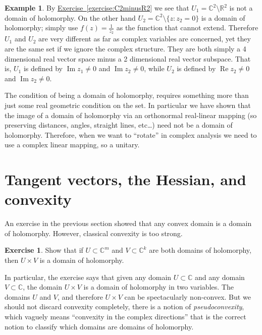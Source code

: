 \documentclass[12pt,openany]{book}
\renewcommand{\Re}{\operatorname{Re}}
\renewcommand{\Im}{\operatorname{Im}}
\newcommand{\C}{{\mathbb{C}}}
\newcommand{\R}{{\mathbb{R}}}
\theoremstyle{plain}
\theoremstyle{remark}
\theoremstyle{definition}
\newenvironment{exbox}{%
    \def\FrameCommand{\vrule width 1pt \relax\hspace {10pt}}%
    \MakeFramed {\advance \hsize -\width \FrameRestore }%
}{%
    \endMakeFramed
}
\theoremstyle{exercise}
\newtheorem{exercise}{Exercise}[section]
\theoremstyle{example}
\newtheorem{example}[thm]{Example}
\newcommand{\exerciseref}[1]{\hyperref[#1]{Exercise~\ref*{#1}}}
\begin{document}
\begin{example}
By
\exerciseref{exercise:C2minusR2} we see
that
$U_1 = \C^2 \setminus \R^2$
is not a domain of holomorphy.  On the other hand
$U_2 = \C^2 \setminus \{ z : z_2 = 0 \}$ is a domain of holomorphy;
simply
use $f(z) = \frac{1}{z_2}$ as the function that cannot extend.
Therefore $U_1$ and $U_2$ are very different as far as complex variables are
concerned, yet they are the same set if we ignore the complex structure.
They are both simply a 4 dimensional real vector space minus a 2 dimensional
real vector subspace.  That is, $U_1$ is defined by
$\Im z_1 \not= 0$ and $\Im z_2 \not= 0$,
while $U_2$ is defined by
$\Re z_2 \not= 0$ and $\Im z_2 \not= 0$.

The condition of being a domain of holomorphy,
requires something more than just some real geometric condition on the
set.  In particular we have shown that the image of a domain of holomorphy
via an orthonormal
real-linear mapping 
(so preserving distances, angles, straight lines, etc\ldots)
need not be a domain of holomorphy.  Therefore, when we want to
``rotate'' in complex analysis we need to use a complex linear mapping,
so a unitary.
\end{example}


\section{Tangent vectors, the Hessian, and convexity}

An exercise in the previous section showed that any convex domain is a
domain of holomorphy.  However, classical convexity is too strong.

\begin{exbox}
\begin{exercise}
Show that if $U \subset \C^m$ and $V \subset \C^k$ are both domains of
holomorphy, then $U \times V$ is a domain of holomorphy.
\end{exercise}
\end{exbox}

In particular, the exercise says that
given any domain $U \subset \C$ and any domain $V \subset \C$, the domain
$U \times V$ is a domain of holomorphy in two variables.  The domains
$U$ and $V$, and therefore $U \times V$ can be spectacularly non-convex.
But we should not discard convexity completely, there is a notion of
\emph{pseudoconvexity}, which vaguely means ``convexity in the 
complex directions'' that is the correct notion to classify which
domains are domains of holomorphy.
\end{document}

